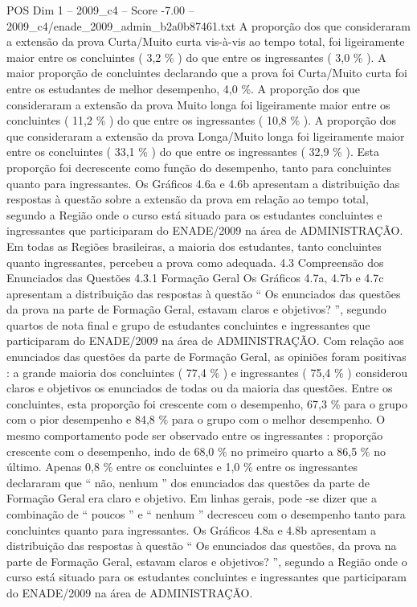 \begin{textsample}{POS Dim 1 – 2009\_c4 – Score -7.00 – 2009\_c4/enade\_2009\_admin\_b2a0b87461.txt}
A proporção dos que consideraram a extensão da prova Curta/Muito curta vis-à-vis ao tempo total, foi ligeiramente maior entre os concluintes ( 3,2 \% ) do que entre os ingressantes ( 3,0 \% ).
A maior proporção de concluintes declarando que a prova foi Curta/Muito curta foi entre os estudantes de melhor desempenho, 4,0 \%.
A proporção dos que consideraram a extensão da prova Muito longa foi ligeiramente maior entre os concluintes ( 11,2 \% ) do que entre os ingressantes ( 10,8 \% ).
A proporção dos que consideraram a extensão da prova Longa/Muito longa foi ligeiramente maior entre os concluintes ( 33,1 \% ) do que entre os ingressantes ( 32,9 \% ).
Esta proporção foi decrescente como função do desempenho, tanto para concluintes quanto para ingressantes.
Os Gráficos 4.6a e 4.6b apresentam a distribuição das respostas à questão sobre a extensão da prova em relação ao tempo total, segundo a Região onde o curso está situado para os estudantes concluintes e ingressantes que participaram do ENADE/2009 na área de ADMINISTRAÇÃO.
Em todas as Regiões brasileiras, a maioria dos estudantes, tanto concluintes quanto ingressantes, percebeu a prova como adequada. 4.3 Compreensão dos Enunciados das Questões 4.3.1 Formação Geral Os Gráficos 4.7a, 4.7b e 4.7c apresentam a distribuição das respostas à questão “ Os enunciados das questões da prova na parte de Formação Geral, estavam claros e objetivos? ”, segundo quartos de nota final e grupo de estudantes concluintes e ingressantes que participaram do ENADE/2009 na área de ADMINISTRAÇÃO.
Com relação aos enunciados das questões da parte de Formação Geral, as opiniões foram positivas : a grande maioria dos concluintes ( 77,4 \% ) e ingressantes ( 75,4 \% ) considerou claros e objetivos os enunciados de todas ou da maioria das questões.
Entre os concluintes, esta proporção foi crescente com o desempenho, 67,3 \% para o grupo com o pior desempenho e 84,8 \% para o grupo com o melhor desempenho.
O mesmo comportamento pode ser observado entre os ingressantes : proporção crescente com o desempenho, indo de 68,0 \% no primeiro quarto a 86,5 \% no último.
Apenas 0,8 \% entre os concluintes e 1,0 \% entre os ingressantes declararam que “ não, nenhum ” dos enunciados das questões da parte de Formação Geral era claro e objetivo.
Em linhas gerais, pode -se dizer que a combinação de “ poucos ” e “ nenhum ” decresceu com o desempenho tanto para concluintes quanto para ingressantes.
Os Gráficos 4.8a e 4.8b apresentam a distribuição das respostas à questão “ Os enunciados das questões, da prova na parte de Formação Geral, estavam claros e objetivos? ”, segundo a Região onde o curso está situado para os estudantes concluintes e ingressantes que participaram do ENADE/2009 na área de ADMINISTRAÇÃO.

\end{textsample}
